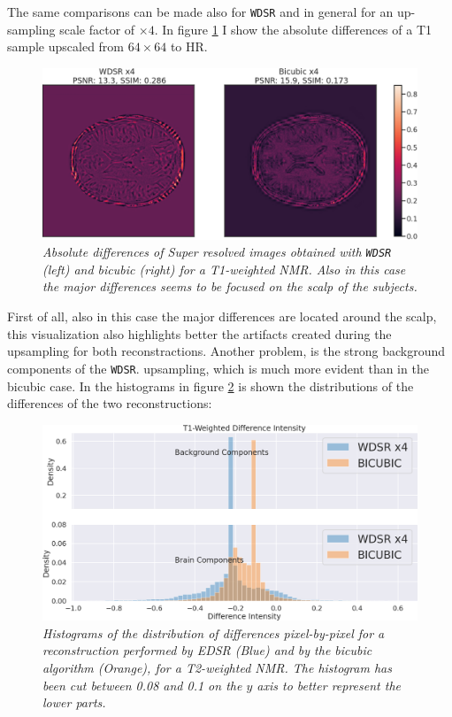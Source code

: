 \documentclass[12pt,a4paper]{report}
\begin{document}
The same comparisons can be made also for {\tt WDSR} and in general for an up-sampling scale factor of $\times 4$. In figure \ref{fig:wdsr-diff-t1} I show the absolute differences of a T1 sample upscaled from $64 \times 64$ to HR.  

\begin{figure}[H]
 \centering
 \includegraphics[scale=0.4]{./images/WDSR_diff_t1.png}
 \caption{\it Absolute differences of Super resolved images obtained with {\tt WDSR} (left) and bicubic (right) for a T1-weighted NMR. Also in this case the major differences seems to be focused on the scalp of the subjects.}
 \label{fig:wdsr-diff-t1}
\end{figure}

First of all, also in this case the major differences are located around the scalp, this visualization also highlights better the artifacts created during the upsampling for both reconstractions.
Another problem, is the strong background components of the {\tt WDSR}. upsampling, which is much more evident than in the bicubic case. 
In the histograms in figure \ref{fig:wdsr-diff-histo-t1} is shown the distributions of the differences of the two reconstructions:

\begin{figure}[H]
 \centering
 \includegraphics[scale=0.3]{./images/WDSR_diff_histo_t1.png}
 \caption{\it Histograms of the distribution of differences pixel-by-pixel for a reconstruction performed by EDSR (Blue) and by the bicubic algorithm (Orange), for a T2-weighted NMR. The histogram has been cut between 0.08 and 0.1 on the $y$ axis to better represent the lower parts.}
 \label{fig:wdsr-diff-histo-t1}
\end{figure}
\end{document}
